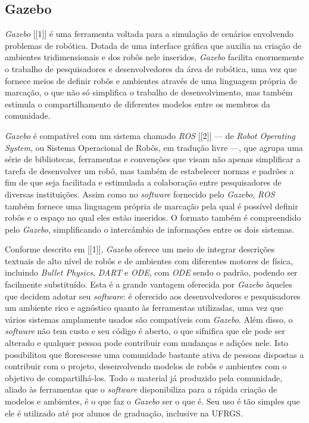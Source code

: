 \documentclass[cic,tc]{iiufrgs}
\begin{document}
\subsection{Gazebo}

\textit{Gazebo} [[1]] é uma ferramenta voltada para a simulação de cenários envolvendo
problemas de robótica. Dotada de uma interface gráfica que auxilia na criação
de ambientes tridimensionais e dos robôs nele inseridos, \textit{Gazebo}
facilita enormemente o trabalho de pesquisadores e desenvolvedores da área de
robótica, uma vez que fornece meios de definir robôs e ambientes através de uma
linguagem própria de marcação, o que não só simplifica o trabalho de
desenvolvimento, mas também estimula o compartilhamento de diferentes modelos
entre os membros da comunidade.


\textit{Gazebo} é compatível com um sistema chamado \textit{ROS} [[2]] --- de
\textit{Robot Operating System}, ou Sistema Operacional de Robôs, em tradução
livre ---, que agrupa uma série de bibliotecas, ferramentas e convenções que
visam não apenas simplificar a tarefa de desenvolver um robô, mas também de
estabelecer normas e padrões a fim de que seja facilitada e estimulada a
colaboração entre pesquisadores de diversas instituições. Assim como no
\textit{software} fornecido pelo \textit{Gazebo}, \textit{ROS} também fornece
uma linguagem própria de marcação pela qual é possível definir robôs e o espaço
no qual eles estão inseridos. O formato também é compreendido pelo
\textit{Gazebo}, simplificando o intercâmbio de informações entre os dois
sistemas.


Conforme descrito em [[1]], \textit{Gazebo} oferece um meio de integrar
descrições textuais de alto nível de robôs e de ambientes com diferentes motores
de física, incluindo \textit{Bullet Physics}, \textit{DART} e \textit{ODE}, com
\textit{ODE} sendo o padrão, podendo ser facilmente substituído. Esta é a grande
vantagem oferecida por \textit{Gazebo} àqueles que decidem adotar seu
\textit{software}: é oferecido aos desenvolvedores e pesquisadores um ambiente
rico e agnóstico quanto às ferramentas utilizadas, uma vez que vários sistemas
amplamente usados são compatíveis com \textit{Gazebo}. Além disso, o
\textit{software} não tem custo e seu código é aberto, o que sifnifica que ele
pode ser alterado e qualquer pessoa pode contribuir com mudanças e adições nele.
Isto possibilitou que florescesse uma comunidade bastante ativa de pessoas
dispostas a contribuir com o projeto, desenvolvendo modelos de robôs e ambientes
com o objetivo de compartilhá-los. Todo o material já produzido pela comunidade,
aliado às ferramentas que o \textit{software} disponibiliza para a rápida
criação de modelos e ambientes, é o que faz o \textit{Gazebo} ser o que é. Seu
uso é tão simples que ele é utilizado até por alunos de graduação, inclusive
na UFRGS.
\end{document}
